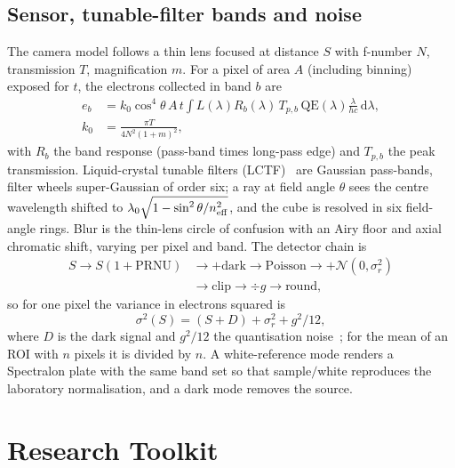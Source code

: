\documentclass[journal]{IEEEtran}
\begin{document}
\subsection{Sensor, tunable-filter bands and noise}
The camera model follows a thin lens focused at distance $S$ with f-number $N$, transmission $T$, magnification $m$. For a pixel of area $A$ (including binning) exposed for $t$, the electrons collected in band $b$ are
\begin{equation}
\begin{split}e_b&=k_0\cos^4\!\theta\,A\,t\int L(\lambda)R_b(\lambda)\,T_{p,b}\,\mathrm{QE}(\lambda)\frac{\lambda}{hc}\,\mathrm d\lambda,\\ k_0&=\frac{\pi T}{4N^2(1+m)^2},\end{split}
\label{eq:electrons}
\end{equation}
with $R_b$ the band response (pass-band times long-pass edge) and $T_{p,b}$ the peak transmission. Liquid-crystal tunable filters (LCTF)~\cite{morris1994lctf} are Gaussian pass-bands, filter wheels super-Gaussian of order six; a ray at field angle $\theta$ sees the centre wavelength shifted to $\lambda_0\sqrt{1-\sin^2\theta/n_{\rm eff}^2}$, and the cube is resolved in six field-angle rings. Blur is the thin-lens circle of confusion with an Airy floor and axial chromatic shift, varying per pixel and band. The detector chain is
\begin{equation}
\begin{split}S\to S(1+\mathrm{PRNU})&\to+\text{dark}\to\mathrm{Poisson}\to+\mathcal N(0,\sigma_r^2)\\&\to\text{clip}\to\div g\to\text{round},\end{split}
\label{eq:detector}
\end{equation}
so for one pixel the variance in electrons squared is
\begin{equation}
\sigma^2(S)=(S+D)+\sigma_r^2+g^2/12,
\label{eq:variance}
\end{equation}
where $D$ is the dark signal and $g^2/12$ the quantisation noise~\cite{janesick2007,healey1994}; for the mean of an ROI with $n$ pixels it is divided by $n$. A white-reference mode renders a Spectralon plate with the same band set so that sample$/$white reproduces the laboratory normalisation, and a dark mode removes the source.

\section{Research Toolkit}
\label{sec:toolkit}
\end{document}
